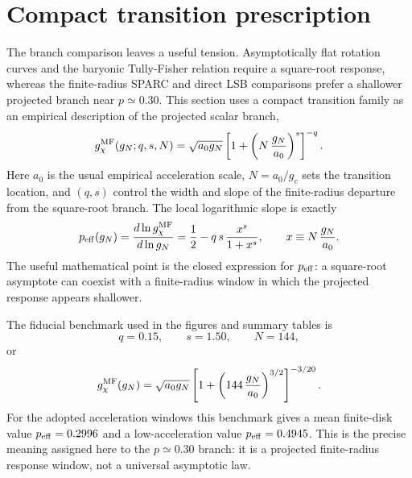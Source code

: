 ﻿\documentclass[twocolumn]{aastex631}
\begin{document}
\section{Compact transition prescription}
\label{sec:master-transition}

The branch comparison leaves a useful tension.  Asymptotically flat rotation curves and the baryonic Tully-Fisher relation require a square-root response, whereas the finite-radius SPARC and direct LSB comparisons prefer a shallower projected branch near $p\simeq0.30$.  This section uses a compact transition family as an empirical description of the projected scalar branch,
\begin{equation}
g_\chi^{\rm MF}(g_N;q,s,N)=
\sqrt{a_0g_N}
\left[1+\left(N\,\frac{g_N}{a_0}\right)^s\right]^{-q}.
\label{eq:gmr-mf-family}
\end{equation}
Here $a_0$ is the usual empirical acceleration scale, $N=a_0/g_c$ sets the transition location, and $(q,s)$ control the width and slope of the finite-radius departure from the square-root branch.  The local logarithmic slope is exactly
\begin{equation}
p_{\rm eff}(g_N)
=\frac{d\ln g_\chi^{\rm MF}}{d\ln g_N}
=\frac{1}{2}
-q\,s\,
\frac{x^s}{1+x^s},
\qquad
x\equiv N\,\frac{g_N}{a_0}.
\label{eq:peff-general}
\end{equation}
The useful mathematical point is the closed expression for $p_{\rm eff}$: a square-root asymptote can coexist with a finite-radius window in which the projected response appears shallower.

The fiducial benchmark used in the figures and summary tables is
\begin{equation}
q=0.15,\qquad s=1.50,\qquad N=144,
\end{equation}
or
\begin{equation}
g_\chi^{\rm MF}(g_N)=
\sqrt{a_0g_N}
\left[1+\left(144\,\frac{g_N}{a_0}\right)^{3/2}\right]^{-3/20}.
\label{eq:gmr-mf}
\end{equation}
For the adopted acceleration windows this benchmark gives a mean finite-disk value $p_{\rm eff}=0.2996$ and a low-acceleration value $p_{\rm eff}=0.4945$.  This is the precise meaning assigned here to the $p\simeq0.30$ branch: it is a projected finite-radius response window, not a universal asymptotic law.
\end{document}
